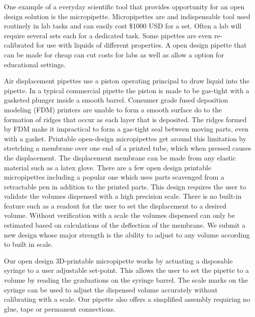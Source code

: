 \documentclass[10pt,letterpaper]{article}
\begin{document}
One example of a everyday scientific tool that provides opportunity for an open design solution is the micropipette.
Micropipettes are and indispensable tool used routinely in lab tasks and can easily cost \$1000 USD for a set.
Often a lab will require several sets each for a dedicated task.
Some pipettes are even re-calibrated for use with liquids of different properties.
A open design pipette that can be made for cheap can cut costs for labs as well as allow a option for educational settings.

Air displacement pipettes use a piston operating principal to draw liquid into the pipette\cite{ISO2002}.
In a typical commercial pipette the piston is made to be gas-tight with a gasketed plunger inside a smooth barrel.
Consumer grade fused deposition modeling (FDM) printers are unable to form a smooth surface do to the formation of ridges that occur as each layer that is deposited.
The ridges formed by FDM make it impractical to form a gas-tight seal between moving parts, even with a gasket.
Printable open-design micropipettes get around this limitation by stretching a membrane over one end of a printed tube, which when pressed causes the displacement.
The displacement membrane can be made from any elastic material such as a latex glove.
There are a few open design printable micropipettes including a popular one which uses parts scavenged from a retractable pen in addition to the printed parts\cite{Baden2014}.
This design requires the user to validate the volumes dispensed with a high precision scale.
There is no built-in feature such as a readout for the user to set the displacement to a desired volume.
Without verification with a scale the volumes dispensed can only be estimated based on calculations of the deflection of the membrane.
We submit a new design whose major strength is the ability to adjust to any volume according to built in scale.

Our open design 3D-printable micropipette works by actuating a disposable syringe to a user adjustable set-point.
This allows the user to set the pipette to a volume by reading the graduations on the syringe barrel.
The scale marks on the syringe can be used to adjust the dispensed volume accurately without calibrating with a scale.
Our pipette also offers a simplified assembly requiring no glue, tape or permanent connections.

\end{document}
